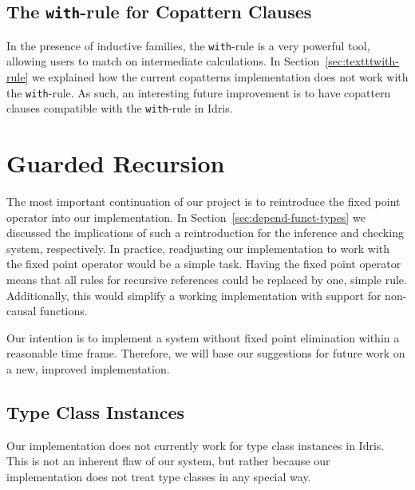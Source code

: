 \subsection{The \texttt{with}-rule for Copattern Clauses}
In the presence of inductive families, the \texttt{with}-rule is a very powerful
tool, allowing users to match on intermediate calculations. In
Section~\ref{sec:textttwith-rule} we explained how the current copatterns implementation
does not work with the \texttt{with}-rule. As such, an interesting future
improvement is to have copattern clauses compatible with the \texttt{with}-rule in Idris.

% 
\section{Guarded Recursion}
\label{sec:guarded-recursion-1}
The most important continuation of our project is to reintroduce the fixed point
operator into our implementation. In Section~\ref{sec:depend-funct-types} we
discussed the implications of such a reintroduction for the inference and
checking system, respectively. In practice, readjusting our implementation to
work with the fixed point operator would be a simple task. Having the fixed
point operator means that all rules for recursive references could be replaced
by one, simple rule. Additionally, this would simplify a working implementation
with support for non-causal functions.

Our intention is to implement a system without fixed point elimination within a reasonable
time frame. Therefore, we will base our suggestions for future work on a new, improved
implementation.


\subsection{Type Class Instances}
Our implementation does not currently work for type class instances in
Idris. This is not an
inherent flaw of our system, but rather because our implementation does not
treat type classes in any special way.

